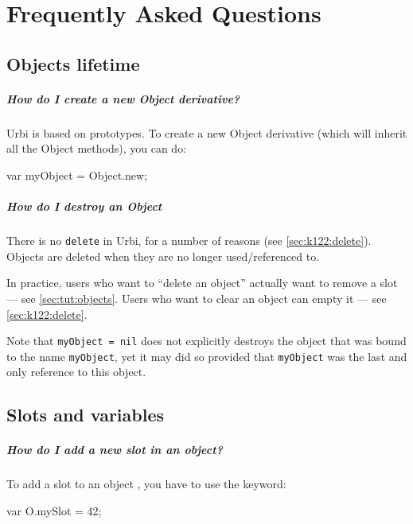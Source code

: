 \chapter{Frequently Asked Questions}
\label{sec:faq}

\section{Objects lifetime}

\paragraph{How do I create a new Object derivative?}
Urbi is based on prototypes. To create a new Object derivative (which
will inherit all the Object methods), you can do:

\begin{urbifixme}
var myObject = Object.new;
\end{urbifixme}

\paragraph{How do I destroy an Object}
There is no \lstinline{delete} in Urbi, for a number of reasons (see
\autoref{sec:k122:delete}).  Objects are deleted when they are no
longer used/referenced to.

In practice, users who want to ``delete an object'' actually want to
remove a slot --- see \autoref{sec:tut:objects}.  Users who want to
clear an object can empty it --- see \autoref{sec:k122:delete}.

Note that \lstinline{myObject = nil} does not explicitly destroys the
object that was bound to the name \lstinline{myObject}, yet it may did
so provided that \lstinline{myObject} was the last and only reference
to this object.

\section{Slots and variables}

\paragraph{How do I add a new slot in an object?}
To add a slot to an object , you have to use the  keyword:

\begin{urbifixme}
var O.mySlot = 42;
\end{urbifixme}

